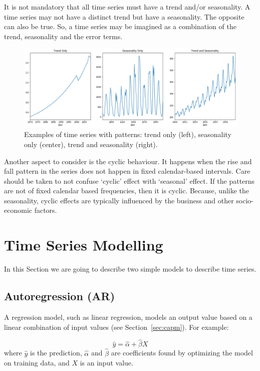It is not mandatory that all time series must have a trend and/or
seasonality. A time series may not have a distinct trend but have a
seasonality. The opposite can also be true. So, a time series may be
imagined as a combination of the trend, seasonality and the error terms.

\begin{figure}[htb]
	\centering
	\includegraphics[width=0.9\linewidth]{figures/time_series_patterns.png}
	\caption{Examples of time series with patterns: trend only (left), seasonality only (center), trend and seasonality (right).}
	\label{fig:time_series_patterns}
\end{figure}
    
Another aspect to consider is the cyclic behaviour. It happens when the
rise and fall pattern in the series does not happen in fixed
calendar-based intervals. Care should be taken to not confuse `cyclic'
effect with `seasonal' effect. If the patterns are not of fixed calendar
based frequencies, then it is cyclic. Because, unlike the seasonality,
cyclic effects are typically influenced by the business and other
socio-economic factors.

\section{Time Series Modelling}\label{time-series-modelling}

In this Section we are going to describe two simple models to describe
time series.

\subsection{Autoregression (AR)}\label{autoregression-ar}

A regression model, such as linear regression, models an output value
based on a linear combination of input values (see Section~\ref{sec:capm}). For
example:

\begin{equation}
\hat{y} = \hat{\alpha} + \hat{\beta}X
\end{equation} 
where \(\hat{y}\) is the prediction, \(\hat{\alpha}\) and \(\hat{\beta}\) are coefficients found
by optimizing the model on training data, and \(X\) is an input value.

